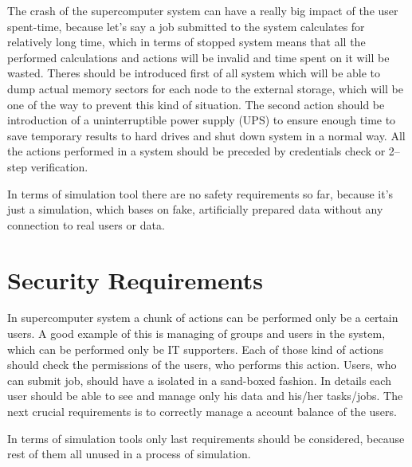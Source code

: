 \documentclass{report}
\begin{document}
The crash of the supercomputer system can have a really big impact of the user spent-time, because let's say a job submitted to the system calculates for relatively long time, which in terms of stopped system means that all the performed calculations and actions will be invalid and time spent on it will be wasted. Theres should be introduced first of all system which will be able to dump actual memory sectors for each node to the external storage, which will be one of the way to prevent this kind of situation. The second action should be introduction of a uninterruptible power supply (UPS) to ensure enough time to save temporary results to hard drives and shut down system in a normal way. All the actions performed in a system should be preceded by credentials check or 2--step verification.
	
In terms of simulation tool there are no safety requirements so far, because it's just a simulation, which bases on fake, artificially prepared data without any connection to real users or data.

\section{Security Requirements}
In supercomputer system a chunk of actions can be performed only be a certain users. A good example of this is managing of groups and users in the system, which can be performed only be IT supporters. Each of those kind of actions should check the permissions of the users, who performs this action. Users, who can submit job, should have a isolated in a sand-boxed fashion. In details each user should be able to see and manage only his data and  his/her tasks/jobs. The next crucial requirements is to correctly manage a account balance of the users.

In terms of simulation tools only last requirements should be considered, because rest of them all unused in a process of simulation.

\end{document}
